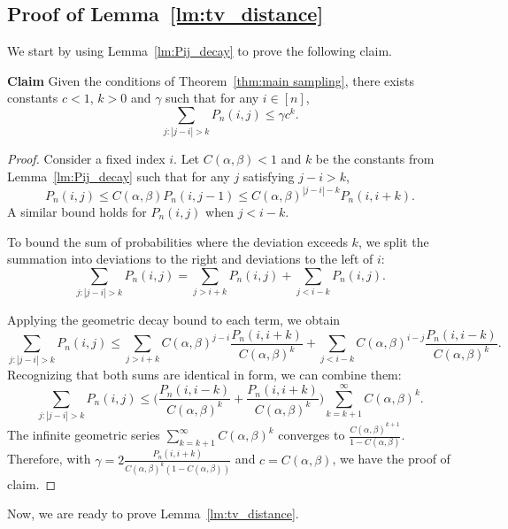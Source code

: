 \documentclass{article}
\begin{document}
\subsection{Proof of Lemma~\ref{lm:tv_distance}}\label{sec: truncation proof}
We start by using Lemma~\ref{lm:Pij_decay} to prove the following claim.

\noindent\textbf{Claim}
Given the conditions of Theorem~\ref{thm:main sampling}, there exists constants $c<1$, \( k>0 \) and $\gamma$ such that for any \(i\in [n]\),
    \[
    \sum_{j : |j - i| > k} P_n(i, j) \leq \gamma c^{k}.
    \]
\begin{proof}
    Consider a fixed index \( i \).
    Let \( C(\alpha, \beta)<1 \) and $k$ be the constants from Lemma~\ref{lm:Pij_decay} such that for any \( j \) satisfying \( j - i > k\),
    \[
    P_n(i, j) \leq C(\alpha, \beta) P_n(i, j-1) \leq C(\alpha, \beta)^{|j - i|-k} P_n(i, i+k).
    \]
    A similar bound holds for $ P_n(i,j)$ when $j<i-k$. 
    
    To bound the sum of probabilities where the deviation exceeds \( k \), we split the summation into deviations to the right and deviations to the left of \( i \):
    \[
    \sum_{j : |j - i| > k} P_n(i, j) = \sum_{j > i + k} P_n(i, j) + \sum_{j < i - k} P_n(i, j).
    \]
    
    Applying the geometric decay bound to each term, we obtain
    \[
    \sum_{j : |j - i| > k} P_n(i, j) \leq \sum_{j > i + k} C(\alpha, \beta)^{j - i} \frac{P_n(i, i+k)}{C(\alpha, \beta)^{k}} + \sum_{j < i - k} C(\alpha, \beta)^{i - j} \frac{P_n(i, i-k)}{C(\alpha, \beta)^{k}} .
    \]
    Recognizing that both sums are identical in form, we can combine them:
    \[
    \sum_{j : |j - i| > k} P_n(i, j) \leq \Big(\frac{P_n(i, i-k)}{C(\alpha, \beta)^{k}} + \frac{P_n(i, i+k)}{C(\alpha, \beta)^{k}} \Big) \sum_{k = k + 1}^{\infty} C(\alpha, \beta)^k.
    \]    
    The infinite geometric series \( \sum_{k = k + 1}^{\infty} C(\alpha, \beta)^k \) converges to \( \frac{C(\alpha, \beta)^{k
    + 1}}{1 - C(\alpha, \beta)} \). Therefore, with $\gamma =2\frac{P_n(i, i+k)}{C(\alpha, \beta)^{k}(1 - C(\alpha, \beta))} $ and $c=C(\alpha,\beta)$, we have the proof of claim. 
\end{proof}
Now, we are ready to prove Lemma~\ref{lm:tv_distance}. 
\end{document}
